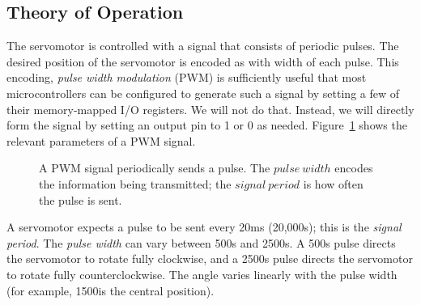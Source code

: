 \subsection{Theory of Operation}

The servomotor is controlled with a signal that consists of periodic pulses.
The desired position of the servomotor is encoded as with width of each pulse.
This encoding, \textit{pulse width modulation} (PWM) is sufficiently useful that most microcontrollers can be configured to generate such a signal by setting a few of their memory-mapped I/O registers.
We will not do that.
Instead, we will directly form the signal by setting an output pin to 1 or 0 as needed.
Figure~\ref{fig:pwm} shows the relevant parameters of a PWM signal.

\begin{figure}
    \begin{center}
        \caption{A PWM signal periodically sends a pulse. The $pulse\ width$ encodes the information being transmitted; the $signal\ period$ is how often the pulse is sent.}\label{fig:pwm}
    \end{center}
\end{figure}

A servomotor expects a pulse to be sent every 20ms (20,000\textmu s); this is the \textit{signal period}.
The \textit{pulse width} can vary between 500\textmu s and 2500\textmu s.
A 500\textmu s pulse directs the servomotor to rotate fully clockwise,
and a 2500\textmu s pulse directs the servomotor to rotate fully counterclockwise.
The angle varies linearly with the pulse width (for example, 1500\textmu is the central position).

